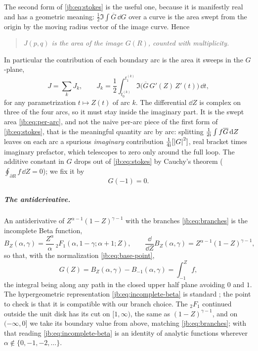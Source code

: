 The second form of \eqref{jb:eq:stokes} is the useful one, because it is manifestly real and has a
geometric meaning: $\tfrac12 \Im \int \overline{G} \, \dd G$ over a curve is the area swept from the
origin by the moving radius vector of the image curve.
Hence
\begin{quote}
  \emph{$J(p, q)$ is the area of the image $G(R)$, counted with multiplicity.}
\end{quote}
In particular the contribution of each boundary arc is the area it sweeps in the $G$-plane,
\begin{equation}
  \label{jb:eq:per-arc}
  J
    = \sum_k J_k,
  \qquad
  J_k
    = \frac12 \int_{t_0^{(k)}}^{t_1^{(k)}}
      \Im \bigl( \overline{G} \, G'(Z) \, Z'(t) \bigr) \, \dd t,
\end{equation}
for any parametrization $t \mapsto Z(t)$ of arc $k$.
The differential $\dd Z$ is complex on three of the four arcs, so it must stay inside the imaginary
part.
It is the swept area \eqref{jb:eq:per-arc}, and not the naive per-arc piece of the first form of
\eqref{jb:eq:stokes}, that is the meaningful quantity arc by arc: splitting
$\tfrac{1}{2\mathrm{i}} \int f \overline{G} \, \mathrm{d} Z$ leaves on each arc a spurious \emph{imaginary}
contribution $\tfrac{1}{4\mathrm{i}} [{|G|}^2]$, real bracket times imaginary prefactor, which telescopes
to zero only around the full loop.
The additive constant in $G$ drops out of \eqref{jb:eq:stokes} by Cauchy's theorem
($\oint_{\partial R} f \, \dd Z = 0$); we fix it by
\begin{equation}
  \label{jb:eq:base-point}
  G(-1)
    = 0 .
\end{equation}

\subparagraph{The antiderivative.}
An antiderivative of $Z^{\alpha - 1} (1 - Z)^{\gamma - 1}$ with the branches \eqref{jb:eq:branches} is
the incomplete Beta function,
\begin{equation}
  \label{jb:eq:incomplete-beta}
  B_Z(\alpha, \gamma)
    = \frac{Z^{\alpha}}{\alpha} \, {}_2F_1(\alpha, 1 - \gamma; \alpha + 1; Z),
  \qquad
  \frac{\dd}{\dd Z} B_Z(\alpha, \gamma)
    = Z^{\alpha - 1} (1 - Z)^{\gamma - 1},
\end{equation}
so that, with the normalization \eqref{jb:eq:base-point},
\begin{equation}
  \label{jb:eq:G-def}
  G(Z)
    = B_Z(\alpha, \gamma) - B_{-1}(\alpha, \gamma)
    = \int_{-1}^{Z} f,
\end{equation}
the integral being along any path in the closed upper half plane avoiding $0$ and $1$.
The hypergeometric representation \eqref{jb:eq:incomplete-beta} is standard \cite{Nist:DLMF}; the point
to check is that it is compatible with our branch choice.
The ${}_2F_1$ continued outside the unit disk has its cut on $[1, \infty)$, the same as
$(1 - Z)^{\gamma - 1}$, and on $(-\infty, 0]$ we take its boundary value from above, matching
\eqref{jb:eq:branches}; with that reading \eqref{jb:eq:incomplete-beta} is an identity of analytic
functions wherever $\alpha \notin \{0, -1, -2, \dots\}$.


